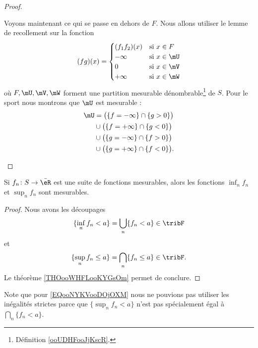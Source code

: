 \begin{proof}
\begin{subproof}
\begin{subproof}
            Voyons maintenant ce qui se passe en dehors de \( F\). Nous allons utiliser le lemme de recollement sur la fonction
            \begin{equation}
                (fg)(x)=\begin{cases}
                    (f_1f_2)(x)    &   \text{si \( x\in F\)}\\
                    -\infty    &    \text{si \( x\in\mU\)}\\
                    0    &    \text{si \( x\in \mV\)}\\
                    +\infty    &    \text{si \( x\in\mW\)}
                \end{cases}
            \end{equation}
            où \( F,\mU,\mV,\mW\) forment une partition mesurable dénombrable\footnote{Définition \ref{ooUDHFooJjKscR}.} de \( S\). Pour le sport nous montrons que \( \mU\) est mesurable :
            \begin{subequations}
                \begin{align}
                    \mU&=\big( \{ f=-\infty \}\cap\{ g>0 \} \big)\\
                    &\cup\big( \{ f=+\infty \}\cap\{ g<0 \} \big)\\
                    &\cup\big( \{ g=-\infty \}\cap\{ f>0 \} \big)\\
                    &\cup\big( \{ g=+\infty \}\cap\{ f<0 \}\big).
                \end{align}
            \end{subequations}
        \end{subproof}
    \end{subproof}
\end{proof}

\begin{proposition}     \label{ooABKWooPbfSOZ}
    Si \( f_n\colon S\to \bar \eR\) est une suite de fonctions mesurables, alors les fonctions \( \inf_n f_n\) et \( \sup_nf_n\) sont mesurables.
\end{proposition}

\begin{proof}
    Nous avons les découpages
    \begin{equation}
        \{ \inf_nf_n<a \}=\bigcup_n\{ f_n<a \}\in\tribF
    \end{equation}
    et
    \begin{equation}        \label{EQooNYKVooDOjOXM}
        \{ \sup_nf_n\leq a \}=\bigcap_n\{ f_n\leq a \}\in\tribF.
    \end{equation}
    Le théorème \ref{THOooWHFLooKYGsOm} permet de conclure.
\end{proof}
Note que pour \eqref{EQooNYKVooDOjOXM} nous ne pouvions pas utiliser les inégalités strictes parce que \( \{ \sup_nf_n<a \}\) n'est pas spécialement égal à \( \bigcap_n\{ f_n<a \}\).

